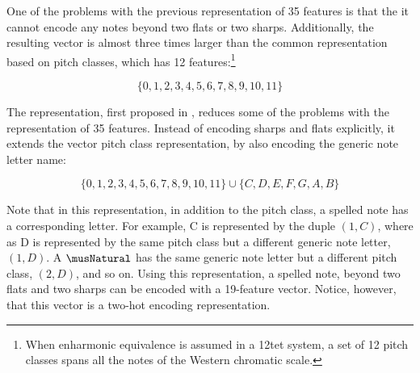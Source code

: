 
One of the problems with the previous representation of 35
features is that the it cannot encode any notes beyond two
flats or two sharps. Additionally, the resulting vector is
almost three times larger than the common representation
based on pitch classes, which has 12 features:\footnote{When
enharmonic equivalence is assumed in a \gls{12tet} system, a
set of 12 pitch classes spans all the notes of the Western
chromatic scale.}

\begin{equation}
    \{0, 1, 2, 3, 4, 5, 6, 7, 8, 9, 10, 11\}
\end{equation}

The representation, first proposed in
\textcite{napoleslopez2021augmentednet}, reduces some of the
problems with the representation of 35 features. Instead of
encoding sharps and flats explicitly, it extends the vector
pitch class representation, by also encoding the generic
note letter name:

\begin{equation}
    \{0, 1, 2, 3, 4, 5, 6, 7, 8, 9, 10, 11\} \cup \{C, D, E, F, G, A, B\}
\end{equation}

Note that in this representation, in addition to the pitch
class, a spelled note has a corresponding letter. For
example, C\musSharp{} is represented by the duple $(1, C)$,
where as D\musFlat{} is represented by the same pitch class
but a different generic note letter, $(1, D)$. A
$\musNatural$ has the same generic note letter but a
different pitch class, $(2, D)$, and so on. Using this
representation, a spelled note, beyond two flats and two
sharps can be encoded with a 19-feature vector. Notice,
however, that this vector is a two-hot encoding
representation.
